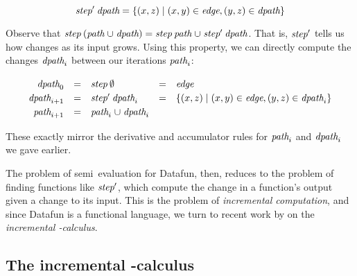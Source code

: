 \nopagebreak[2]
\[
\text{\itshape step}' \mskip 4mu plus 4mu minus 1mu\text{\itshape dpath} =
\{(x,z) \mathrel{|} (x,y) \in \text{\itshape edge}, (y,z) \in \text{\itshape dpath}\}
\]

\noindent
Observe that $\name{step} \<(\name{path} \cup \name{dpath}) =
\name{step}\<\name{path} \cup \name{step}'\<\name{dpath}$.
%
That is, $\text{\itshape step}'$ tells us how  changes as its input grows.
%
Using this property, we can directly compute the changes $\text{\itshape dpath}_i$
between our iterations $\text{\itshape path}_i$:


\[\def\arraystretch{1.2}
\begin{array}{rclcl}
  \name{dpath}_0 &=& \name{step}\<\emptyset
  &=& \name{edge}
  \\
  \name{dpath}_{i+1} &=& \name{step}'\<\name{dpath}_i
  &=& \setfor{(x,z)}{(x,y) \in \name{edge}, (y,z) \in \name{dpath}_i}
  \\
  \name{path}_{i+1} &=& \name{path}_i \cup \name{dpath}_i
\end{array}\]

\noindent These exactly mirror the derivative and accumulator rules for
\(\text{\itshape path}_i\) and \(\text{\itshape dpath}_i\) we gave earlier.
%

The problem of semi\naive\ evaluation for Datafun, then, reduces to the problem
of finding functions like $\text{\itshape step}'$, which compute the change in a
function's output given a change to its input.
%
This is the problem of \emph{incremental computation}, and since Datafun is a
functional language, we turn to recent work by \citet{incremental} on the
\emph{incremental \fn-calculus}.



\subsection{The incremental \boldfn-calculus}
\label{sec:seminaive-via-incremental}

\XXX



